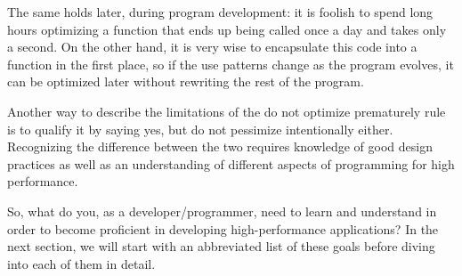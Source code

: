The same holds later, during program development: it is foolish to spend long hours optimizing a function that ends up being called once a day and takes only a second. On the other hand, it is very wise to encapsulate this code into a function in the first place, so if the use patterns change as the program evolves, it can be optimized later without rewriting the rest of the program.

Another way to describe the limitations of the do not optimize prematurely rule is to qualify it by saying yes, but do not pessimize intentionally either. Recognizing the difference between the two requires knowledge of good design practices as well as an understanding of different aspects of programming for high performance. 

So, what do you, as a developer/programmer, need to learn and understand in order to become proficient in developing high-performance applications? In the next section, we will start with an abbreviated list of these goals before diving into each of them in detail.

















